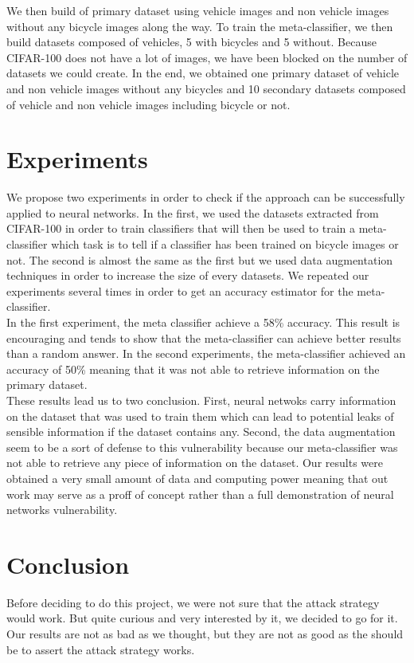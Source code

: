 \documentclass{article}
\begin{document}
We then build of primary dataset using vehicle images and non vehicle images without any bicycle images along the way. To train the meta-classifier, we then build datasets composed of vehicles, 5 with bicycles and 5 without. Because \textsc{CIFAR-100} does not have a lot of images, we have been blocked on the number of datasets we could create. In the end, we obtained one primary dataset of vehicle and non vehicle images without any bicycles and 10 secondary datasets composed of vehicle and non vehicle images including bicycle or not.

\section{Experiments}

We propose two experiments in order to check if the approach can be successfully applied to neural networks. In the first, we used the datasets extracted from \textsc{CIFAR-100} in order to train classifiers that will then be used to train a meta-classifier which task is to tell if a classifier has been trained on bicycle images or not. The second is almost the same as the first but we used data augmentation techniques in order to increase the size of every datasets. We repeated our experiments several times in order to get an accuracy estimator for the meta-classifier.\\

In the first experiment, the meta classifier achieve a 58\% accuracy. This result is encouraging and tends to show that the meta-classifier can achieve better results than a random answer. In the second experiments, the meta-classifier achieved an accuracy of 50\% meaning that it was not able to retrieve information on the primary dataset.\\

These results lead us to two conclusion. First, neural netwoks carry information on the dataset that was used to train them which can lead to potential leaks of sensible information if the dataset contains any. Second, the data augmentation seem to be a sort of defense to this vulnerability because our meta-classifier was not able to retrieve any piece of information on the dataset. Our results were obtained a very small amount of data and computing power meaning that out work may serve as a proff of concept rather than a full demonstration of neural networks vulnerability.

\section{Conclusion}
Before deciding to do this project, we were not sure that the attack strategy would work. But quite curious and very interested by it, we decided to go for it. Our results are not as bad as we thought, but they are not as good as the should be to assert the attack strategy works.\\
\end{document}

